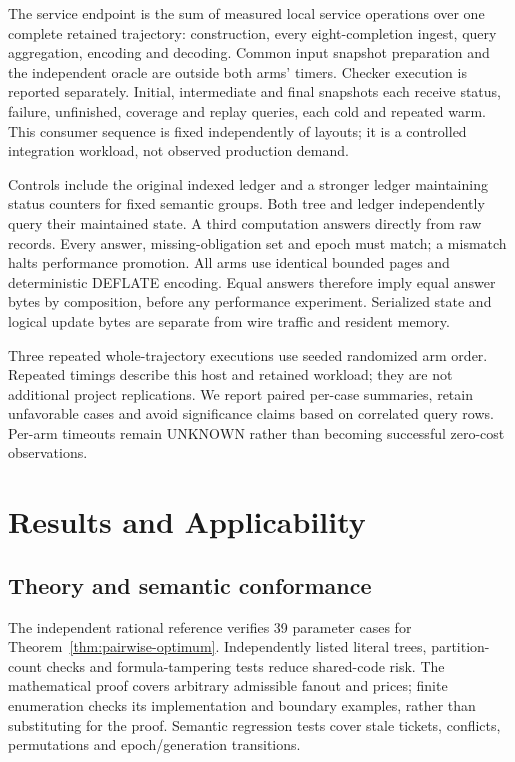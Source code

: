 \documentclass[10pt,journal,compsoc]{IEEEtran}
\theoremstyle{definition}\newtheorem{definition}[theorem]{Definition}
\begin{document}
The service endpoint is the sum of measured local service operations over
one complete retained trajectory: construction, every eight-completion
ingest, query aggregation, encoding and decoding. Common input snapshot
preparation and the independent oracle are outside both arms' timers.
Checker execution is reported separately. Initial, intermediate and final
snapshots each receive status, failure, unfinished, coverage and replay
queries, each cold and repeated warm. This consumer sequence is fixed
independently of layouts; it is a controlled integration workload, not
observed production demand.

Controls include the original indexed ledger and a stronger ledger maintaining
status counters for fixed semantic groups. Both tree and ledger independently
query their maintained state. A third computation answers directly from raw
records. Every answer, missing-obligation set and epoch must match;
a mismatch halts performance promotion. All arms use identical bounded
pages and deterministic DEFLATE encoding. Equal answers therefore imply
equal answer bytes by composition, before any performance experiment.
Serialized state and logical update bytes are separate from wire traffic
and resident memory.

Three repeated whole-trajectory executions use seeded randomized arm order.
Repeated timings describe this host and retained workload; they are not
additional project replications. We report paired per-case summaries,
retain unfavorable cases and avoid significance claims based on correlated
query rows. Per-arm timeouts remain $\mathrm{UNKNOWN}$ rather than becoming
successful zero-cost observations.



\section{Results and Applicability}\label{sec:jresults}
\subsection{Theory and semantic conformance}
The independent rational reference verifies 39 parameter cases for
Theorem~\ref{thm:pairwise-optimum}. Independently listed literal trees,
partition-count checks and formula-tampering tests reduce shared-code risk.
The mathematical proof covers arbitrary admissible fanout and prices;
finite enumeration checks its implementation and boundary examples, rather
than substituting for the proof. Semantic regression tests cover stale
tickets, conflicts, permutations and epoch/generation transitions.
\end{document}
